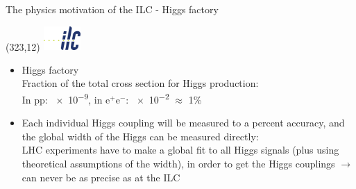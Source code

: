 \documentclass[xcolor={dvipsnames}]{beamer}
\newcommand{\ilclogo}{
  \setlength{\TPHorizModule}{1pt}
  \setlength{\TPVertModule}{1pt}
  \begin{textblock}{1}(323,12)
   \includegraphics[width=40pt,height=26pt]{figures/ILC.jpeg}
  \end{textblock}
}
\begin{document}
\begin{frame}{The physics motivation of the ILC - Higgs factory}
\ilclogo
\begin{itemize}
\item Higgs factory\\
Fraction of the total cross section for Higgs production:\\
In pp: \num{e-9}, in e$^+$e$^-$: \num{e-2} $\approx$ 1\%
\item Each individual Higgs coupling will be measured to a percent accuracy, and the global width of the Higgs can be measured directly:\\LHC experiments have to make a global fit to all Higgs signals (plus using theoretical assumptions of the width), in order to get the Higgs couplings $ \rightarrow$ can never be as precise as at the ILC
\end{itemize}
\end{frame}
\end{document}
